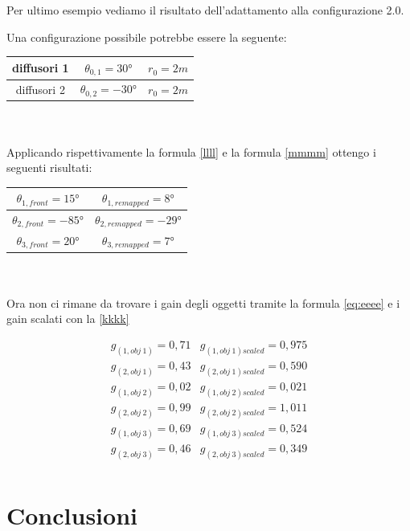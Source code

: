 \documentclass[12pt,a4paper]{report}
\begin{document}
Per ultimo esempio vediamo il risultato dell'adattamento alla configurazione 2.0.

Una configurazione possibile potrebbe essere la seguente:

\begin{tabular}{|c|c|c|}
\hline
diffusori 1 & $\theta_{0,1}=30°$ & $r_0=2m$\\
\hline
diffusori 2 & $\theta_{0,2}=-30°$ & $r_0=2m$\\
\hline
\end{tabular} \\
\\

Applicando rispettivamente la formula \ref{llll} e la formula \ref{mmmm} ottengo i seguenti risultati:


\begin{tabular}{|c|c|}
\hline
$\theta_{1,front} = 15°$     & $\theta_{1,remapped} =  8°  $   \\
\hline
$\theta_{2,front} = -85°$     & $\theta_{2,remapped} = -29° $     \\
\hline
$\theta_{3,front} = 20°$    & $ \theta_{3,remapped} =  7° $    \\
\hline
\end{tabular} \\
\\

Ora non ci rimane da trovare i gain degli oggetti tramite la formula \ref{eq:eeee} e i gain scalati con la \ref{kkkk}

\begin{equation}
\begin{matrix}
g_{(1,obj\ 1)} = 0,71 & g_{(1,obj\ 1)scaled} = 0,975\\
g_{(2,obj\ 1)} = 0,43 & g_{(2,obj\ 1)scaled} = 0,590\\
g_{(1,obj\ 2)} = 0,02 & g_{(1,obj\ 2)scaled} = 0,021\\
g_{(2,obj\ 2)} = 0,99 & g_{(2,obj\ 2)scaled} = 1,011\\
g_{(1,obj\ 3)} = 0,69 & g_{(1,obj\ 3)scaled} = 0,524\\
g_{(2,obj\ 3)} = 0,46 & g_{(2,obj\ 3)scaled} = 0,349\\
\end{matrix}
\label{gscalatiesempio3}
\end{equation}










\chapter*{Conclusioni}
\end{document}
